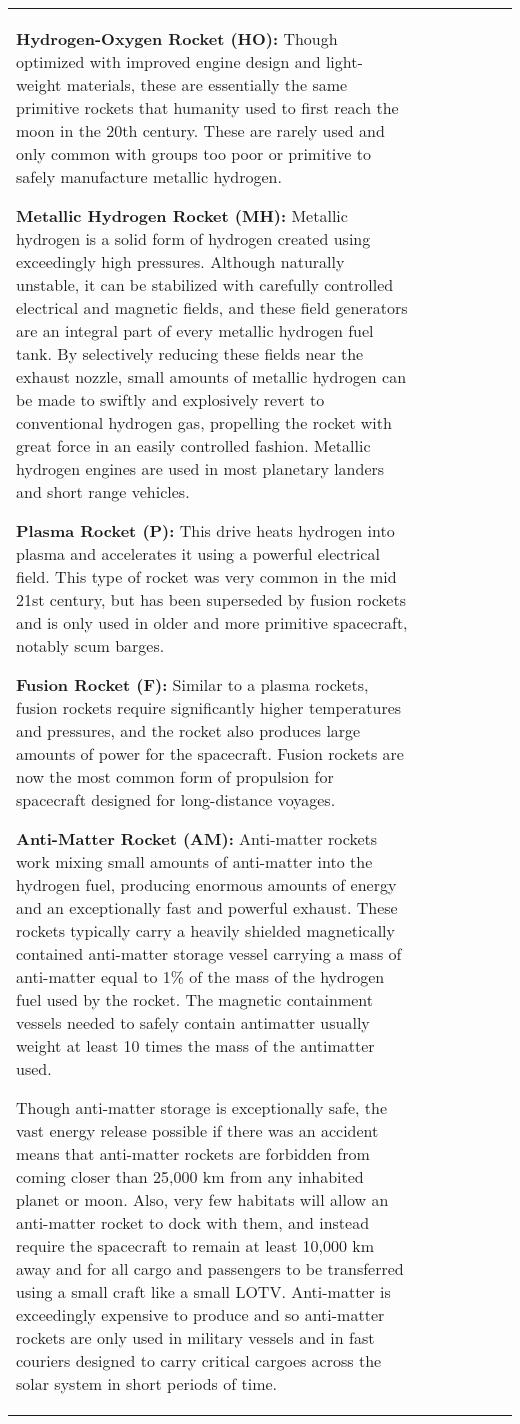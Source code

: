 \begin{tabular}{|l|l|l|l|l|l|l|}
\textbf{Hydrogen-Oxygen Rocket (HO):} Though optimized with improved engine design and light-weight materials, these are essentially the same primitive rockets that humanity used to first reach the moon in the 20th century. These are rarely used and only common with groups too poor or primitive to safely manufacture metallic hydrogen. 

\textbf{Metallic Hydrogen Rocket (MH):} Metallic hydrogen is a solid form of hydrogen created using exceedingly high pressures. Although naturally unstable, it can be stabilized with carefully controlled electrical and magnetic fields, and these field generators are an integral part of every metallic hydrogen fuel tank. By selectively reducing these fields near the exhaust nozzle, small amounts of metallic hydrogen can be made to swiftly and explosively revert to conventional hydrogen gas, propelling the rocket with great force in an easily controlled fashion. Metallic hydrogen engines are used in most planetary landers and short range vehicles. 

\textbf{Plasma Rocket (P):} This drive heats hydrogen into plasma and accelerates it using a powerful electrical field. This type of rocket was very common in the mid 21st century, but has been superseded by fusion rockets and is only used in older and more primitive spacecraft, notably scum barges. 

\textbf{Fusion Rocket (F):} Similar to a plasma rockets, fusion rockets require significantly higher temperatures and pressures, and the rocket also produces large amounts of power for the spacecraft. Fusion rockets are now the most common form of propulsion for spacecraft designed for long-distance voyages. 

\textbf{Anti-Matter Rocket (AM):} Anti-matter rockets work mixing small amounts of anti-matter into the hydrogen fuel, producing enormous amounts of energy and an exceptionally fast and powerful exhaust. These rockets typically carry a heavily shielded magnetically contained anti-matter storage vessel carrying a mass of anti-matter equal to 1\% of the mass of the hydrogen fuel used by the rocket. The magnetic containment vessels needed to safely contain antimatter usually weight at least 10 times the mass of the antimatter used. 

Though anti-matter storage is exceptionally safe, the vast energy release possible if there was an accident means that anti-matter rockets are forbidden from coming closer than 25,000 km from any inhabited planet or moon. Also, very few habitats will allow an anti-matter rocket to dock with them, and instead require the spacecraft to remain at least 10,000 km away and for all cargo and passengers to be transferred using a small craft like a small LOTV. Anti-matter is exceedingly expensive to produce and so anti-matter rockets are only used in military vessels and in fast couriers designed to carry critical cargoes across the solar system in short periods of time. 


\end{tabular}
